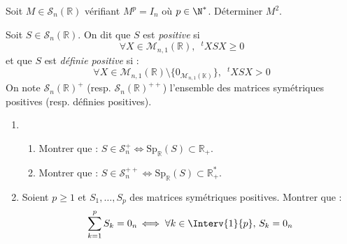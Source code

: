 \documentclass[a4paper,10pt]{report}
\begin{document}
\begin{Exercice}{} Soit $M \in  \mathcal{S}_{n}(\mathbb{R})$ vérifiant $M^{p}= I_{n}$ où $p \in \N^{*}$. Déterminer $M^2$.
\end{Exercice}



\begin{Exercice}{} Soit $S \in \mathcal{S}_n(\mathbb{R})$. On dit que $S$ est \textit{positive} si
$$ \forall X \in \mathcal{M}_{n,1}(\mathbb{R}), \; ~^tX S X \geq 0$$
et que $S$ est \textit{définie positive} si :
$$ \forall X \in \mathcal{M}_{n,1}(\mathbb{R}) \setminus \lbrace 0_{\mathcal{M}_{n,1}(\mathbb{K})} \rbrace, \; ~^tX S X > 0$$
On note $\mathcal{S}_n(\mathbb{R})^+$ (resp. $\mathcal{S}_n(\mathbb{R})^{++}$) l'ensemble des matrices symétriques positives (resp. définies positives).

\begin{enumerate}
\item 
\begin{enumerate}
\item Montrer que : $S \in \mathcal{S}_n^+ \Longleftrightarrow \textrm{Sp}_{\mathbb{R}}(S) \subset \mathbb{R}_+$.
\item Montrer que : $S \in \mathcal{S}_n^{++} \Longleftrightarrow \textrm{Sp}_{\mathbb{R}}(S) \subset \mathbb{R}_+^{*}$.
\end{enumerate}
\item Soient $p \geq 1$ et $S_1, \ldots, S_p$ des matrices symétriques positives. Montrer que :
$$ \sum_{k=1}^p S_k = 0_n  \, \Longleftrightarrow \;  \forall k \in \Interv{1}{p}, \, S_k = 0_n $$
\end{enumerate}
\end{Exercice}
\end{document}
